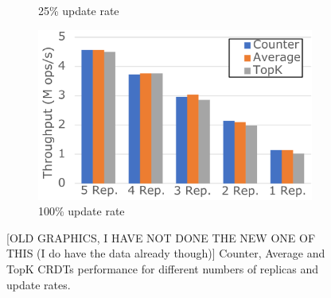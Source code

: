 \documentclass[sigplan,10pt]{acmart}
\begin{document}
\begin{figure}[h]
\begin{subfigure}{.33\linewidth}
		\caption{25\% update rate}
		\label{fig:(new)CounterAvgTopK25upd}
	\end{subfigure}%
	\begin{subfigure}{.33\linewidth}
		\centering
		\includegraphics[width=.97\linewidth]{CounterAvgTopK100upd_v2_cut}
		\caption{100\% update rate}
		\label{fig:(new)CounterAvgTopK100upd}
	\end{subfigure}
	\caption{[OLD GRAPHICS, I HAVE NOT DONE THE NEW ONE OF THIS (I do have the data already though)] Counter, Average and TopK CRDTs performance for different numbers of replicas and update rates.}
	\label{fig:(new)CounterAvgTopK}
\end{figure}
\end{document}
